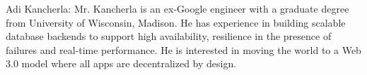 \documentclass[journal]{IEEEtran}
\begin{document}

\begin{IEEEbiographynophoto}{Adi Kancherla:}
    Mr. Kancherla is an ex-Google engineer with a graduate degree from University of Wisconsin, Madison. He has
    experience in building scalable database backends to support high availability, resilience in the presence of
    failures and real-time performance. He is interested in moving the world to a Web 3.0 model where all apps are
    decentralized by design.
\end{IEEEbiographynophoto}






\end{document}
